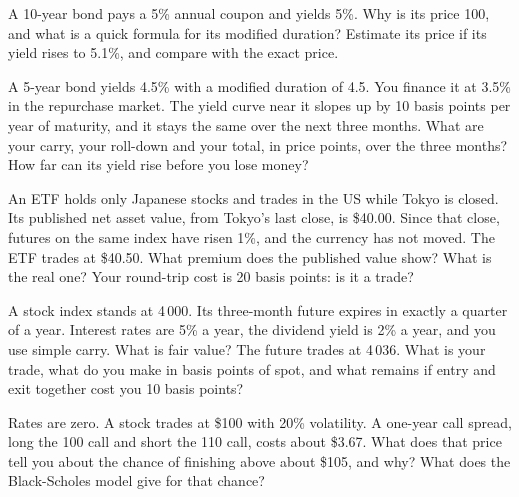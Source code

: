\begin{question}\label{iq:iv2:options-and-bond-arithmetic-at-speed:16}
A 10-year bond pays a 5\% annual coupon and yields 5\%. Why is its price 100, and what is a quick formula for its modified duration? Estimate its price if its yield rises to 5.1\%, and compare with the exact price.
\end{question}

\begin{question}\label{iq:iv2:options-and-bond-arithmetic-at-speed:17}
A 5-year bond yields 4.5\% with a modified duration of 4.5. You finance it at 3.5\% in the repurchase market. The yield curve near it slopes up by 10 basis points per year of maturity, and it stays the same over the next three months. What are your carry, your roll-down and your total, in price points, over the three months? How far can its yield rise before you lose money?
\end{question}

\begin{question}\label{iq:iv2:options-and-bond-arithmetic-at-speed:18}
An ETF holds only Japanese stocks and trades in the US while Tokyo is closed. Its published net asset value, from Tokyo's last close, is \$40.00. Since that close, futures on the same index have risen 1\%, and the currency has not moved. The ETF trades at \$40.50. What premium does the published value show? What is the real one? Your round-trip cost is 20 basis points: is it a trade?
\end{question}

\begin{question}\label{iq:iv2:options-and-bond-arithmetic-at-speed:19}
A stock index stands at 4\,000. Its three-month future expires in exactly a quarter of a year. Interest rates are 5\% a year, the dividend yield is 2\% a year, and you use simple carry. What is fair value? The future trades at 4\,036. What is your trade, what do you make in basis points of spot, and what remains if entry and exit together cost you 10 basis points?
\end{question}

\begin{question}\label{iq:iv2:options-and-bond-arithmetic-at-speed:20}
Rates are zero. A stock trades at \$100 with 20\% volatility. A one-year call spread, long the 100 call and short the 110 call, costs about \$3.67. What does that price tell you about the chance of finishing above about \$105, and why? What does the Black-Scholes model give for that chance?
\end{question}

